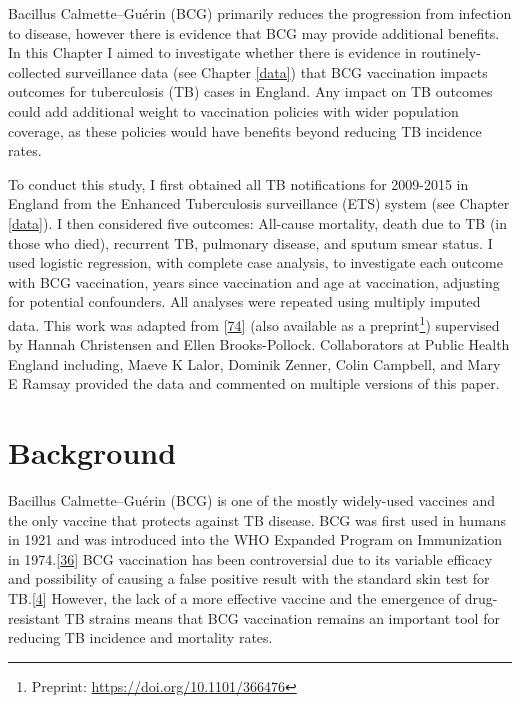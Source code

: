 \documentclass[11pt,twoside]{bristolthesis}
\begin{document}
  Bacillus Calmette--Guérin (BCG) primarily reduces the progression from infection to disease, however there is evidence that BCG may provide additional benefits. In this Chapter I aimed to investigate whether there is evidence in routinely-collected surveillance data (see Chapter \ref{data}) that BCG vaccination impacts outcomes for tuberculosis (TB) cases in England. Any impact on TB outcomes could add additional weight to vaccination policies with wider population coverage, as these policies would have benefits beyond reducing TB incidence rates.
  
  To conduct this study, I first obtained all TB notifications for 2009-2015 in England from the Enhanced Tuberculosis surveillance (ETS) system (see Chapter \ref{data}). I then considered five outcomes: All-cause mortality, death due to TB (in those who died), recurrent TB, pulmonary disease, and sputum smear status. I used logistic regression, with complete case analysis, to investigate each outcome with BCG vaccination, years since vaccination and age at vaccination, adjusting for potential confounders. All analyses were repeated using multiply imputed data. This work was adapted from {[}\protect\hyperlink{ref-Abbott:2019ir}{74}{]} (also available as a preprint\footnote{Preprint: \url{https://doi.org/10.1101/366476}}) supervised by Hannah Christensen and Ellen Brooks-Pollock. Collaborators at Public Health England including, Maeve K Lalor, Dominik Zenner, Colin Campbell, and Mary E Ramsay provided the data and commented on multiple versions of this paper.
  
  \hypertarget{background-4}{%
  \section{Background}\label{background-4}}
  
  Bacillus Calmette--Guérin (BCG) is one of the mostly widely-used vaccines and the only vaccine that protects against TB disease. BCG was first used in humans in 1921 and was introduced into the WHO Expanded Program on Immunization in 1974.{[}\protect\hyperlink{ref-The2004}{36}{]} BCG vaccination has been controversial due to its variable efficacy and possibility of causing a false positive result with the standard skin test for TB.{[}\protect\hyperlink{ref-Zwerling2011a}{4}{]} However, the lack of a more effective vaccine and the emergence of drug-resistant TB strains means that BCG vaccination remains an important tool for reducing TB incidence and mortality rates.
  
\end{document}
